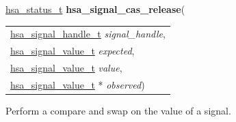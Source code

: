\documentclass[final]{book}
\newcommand{\hsaarg}[1]{\textit{#1}}
\begin{document}
\noindent\begin{tcolorbox}[breakable,nobeforeafter,colframe=white,colback=lightgray,left=0mm]
\hyperlink{group__status_1gad755322e7ff95456520e8abdbe90d225}{hsa_status_t} \hypertarget{group__signals_1ga3fe687b7431dc93a1b5049a9abfa9e5b}{\textbf{hsa_signal_cas_release}}(
\vspace{-3.5mm}\begin{longtable}{@{}p{\textwidth}}
\hspace{1.7em}\hyperlink{group__signals_1ga6592c136d70853d855bc11d9efdbf534}{hsa_signal_handle_t} \hsaarg{signal_handle},\\
\hspace{1.7em}\hyperlink{group__signals_1gacdf7a070a2f988bcf97904a1f5d0e573}{hsa_signal_value_t} \hsaarg{expected},\\
\hspace{1.7em}\hyperlink{group__signals_1gacdf7a070a2f988bcf97904a1f5d0e573}{hsa_signal_value_t} \hsaarg{value},\\
\hspace{1.7em}\hyperlink{group__signals_1gacdf7a070a2f988bcf97904a1f5d0e573}{hsa_signal_value_t} * \hsaarg{observed})\end{longtable}

\end{tcolorbox}
Perform a compare and swap on the value of a signal.
\end{document}
